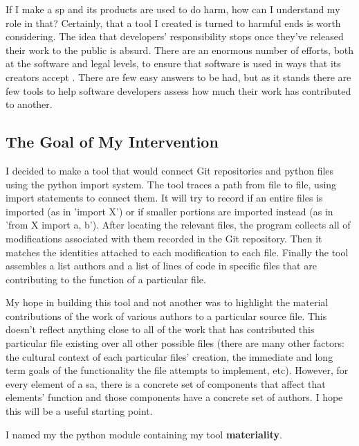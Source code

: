 \documentclass[a4paper,man,natbib,floatsintext]{apa6}
\begin{document}
  If I make a \gls{sp} and its products are used to do harm, how can I understand my role in that? Certainly, that a tool I created is turned to harmful ends is worth considering. The idea that developers' responsibility stops once they've released their work to the public is absurd. There are an enormous number of efforts, both at the software and legal levels, to ensure that software is used in ways that its creators accept \citep{Gabriella_Coleman2012-lq,Kelty2008-jm}. There are few easy answers to be had, but as it stands there are few tools to help software developers assess how much their work has contributed to another. 

  \subsection{The Goal of My Intervention}
  I decided to make a tool that would connect Git repositories and \Gls{python} files using the \Gls{python} import system. The tool traces a path from file to file, using import statements to connect them. It will try to record if an entire files is imported (as in 'import X') or if smaller portions are imported instead (as in 'from X import a, b'). After locating the relevant files, the program collects all of modifications associated with them recorded in the Git repository. Then it matches the identities attached to each modification to each file. Finally the tool assembles a list authors and a list of lines of code in specific files that are contributing to the function of a particular file.

  My hope in building this tool and not another was to highlight the material contributions of the work of various authors to a particular source file. This doesn't reflect anything close to all of the work that has contributed this particular file existing over all other possible files (there are many other factors: the cultural context of each particular files' creation, the immediate and long term goals of the functionality the file attempts to implement, etc). However, for every element of a \gls{sa}, there is a concrete set of components that affect that elements' function and those components have a concrete set of authors. I hope this will be a useful starting point.

  I named my the \Gls{python} module containing my tool \textbf{materiality}.
\end{document}
